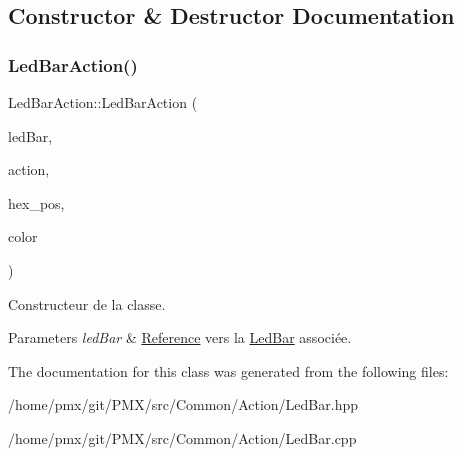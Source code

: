 \subsection{Constructor \& Destructor Documentation}
\mbox{\label{classLedBarAction_adcaf979c06f6f0db45ebc191526bbcf5}} 
\subsubsection{\texorpdfstring{Led\+Bar\+Action()}{LedBarAction()}}
{\footnotesize\ttfamily Led\+Bar\+Action\+::\+Led\+Bar\+Action (\begin{DoxyParamCaption}\item[{\hyperlink{classLedBar}{Led\+Bar} \&}]{led\+Bar,  }\item[{Led\+Bar\+Action\+Name}]{action,  }\item[{uint}]{hex\+\_\+pos,  }\item[{Led\+Color}]{color }\end{DoxyParamCaption})}



Constructeur de la classe. 


\begin{DoxyParams}{Parameters}
{\em led\+Bar} & \hyperlink{structReference}{Reference} vers la \hyperlink{classLedBar}{Led\+Bar} associée. \\
\hline
\end{DoxyParams}


The documentation for this class was generated from the following files\+:\begin{DoxyCompactItemize}
\item 
/home/pmx/git/\+P\+M\+X/src/\+Common/\+Action/Led\+Bar.\+hpp\item 
/home/pmx/git/\+P\+M\+X/src/\+Common/\+Action/Led\+Bar.\+cpp\end{DoxyCompactItemize}
